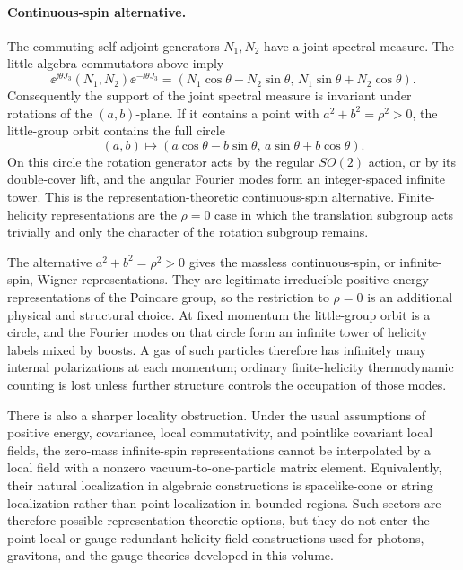 \paragraph{Continuous-spin alternative.}
The commuting self-adjoint generators \(N_1,N_2\) have a joint spectral
measure.  The little-algebra commutators above imply
\[
  \ee^{\ii\theta J_3}(N_1,N_2)\ee^{-\ii\theta J_3}
  =
  (N_1\cos\theta-N_2\sin\theta,\,
   N_1\sin\theta+N_2\cos\theta).
\]
Consequently the support of the joint spectral measure is invariant under
rotations of the \((a,b)\)-plane.  If it contains a point with
\(a^2+b^2=\rho^2>0\), the little-group orbit contains the full circle
\[
  (a,b)\mapsto
  (a\cos\theta-b\sin\theta,\,
   a\sin\theta+b\cos\theta).
\]
On this circle the rotation generator acts by the regular \(SO(2)\) action,
or by its double-cover lift, and the angular Fourier modes form an
integer-spaced infinite tower.  This is the representation-theoretic
continuous-spin alternative.  Finite-helicity representations are the
\(\rho=0\) case in which the translation subgroup acts trivially and only the
character of the rotation subgroup remains.

\begin{remark}
The alternative \(a^2+b^2=\rho^2>0\) gives the massless continuous-spin, or
infinite-spin, Wigner representations.  They are legitimate irreducible
positive-energy representations of the Poincare group, so the restriction to
\(\rho=0\) is an additional physical and structural choice.  At fixed momentum
the little-group orbit is a circle, and the Fourier modes on that circle form
an infinite tower of helicity labels mixed by boosts.  A gas of such particles
therefore has infinitely many internal polarizations at each momentum; ordinary
finite-helicity thermodynamic counting is lost unless further structure
controls the occupation of those modes.

There is also a sharper locality obstruction.  Under the usual assumptions of
positive energy, covariance, local commutativity, and pointlike covariant local
fields, the zero-mass infinite-spin representations cannot be interpolated by a
local field with a nonzero vacuum-to-one-particle matrix element.  Equivalently,
their natural localization in algebraic constructions is spacelike-cone or
string localization rather than point localization in bounded regions.  Such
sectors are therefore possible representation-theoretic options, but they do
not enter the point-local or gauge-redundant helicity field constructions used
for photons, gravitons, and the gauge theories developed in this volume.
\label{rem:continuous-spin-scope}
\end{remark}

